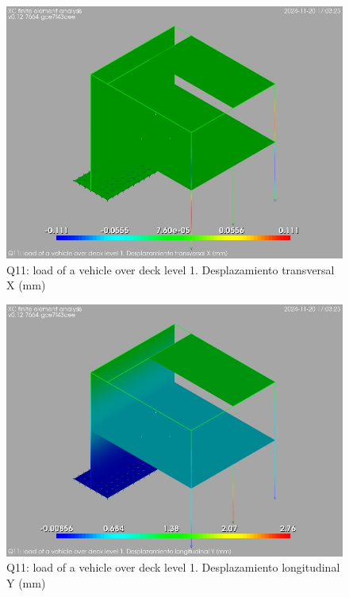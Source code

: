 \begin{figure}[ht]
\begin{center}
\includegraphics[width=\linewidth]{results/graphics/resSimplLC/QvehicleDeck1uX.png}
\caption{Q11: load of a vehicle over deck level 1. Desplazamiento transversal X (mm)}
\label{QvehicleDeck1uX}
\end{center}
\end{figure}
\begin{figure}[ht]
\begin{center}
\includegraphics[width=\linewidth]{results/graphics/resSimplLC/QvehicleDeck1uY.png}
\caption{Q11: load of a vehicle over deck level 1. Desplazamiento longitudinal Y (mm)}
\label{QvehicleDeck1uY}
\end{center}
\end{figure}
